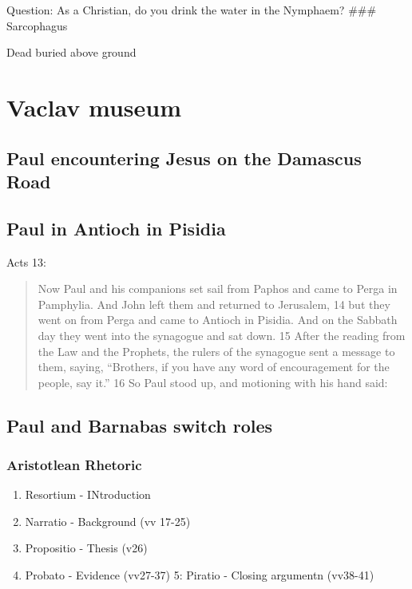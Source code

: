 \documentclass[
]{book}
\providecommand{\tightlist}{%
  \setlength{\itemsep}{0pt}\setlength{\parskip}{0pt}}
\begin{document}
Question: As a Christian, do you drink the water in the Nymphaem?
\#\#\# Sarcophagus

Dead buried above ground

\hypertarget{vaclav-museum}{%
\chapter{Vaclav museum}\label{vaclav-museum}}

\hypertarget{paul-encountering-jesus-on-the-damascus-road}{%
\section{Paul encountering Jesus on the Damascus Road}\label{paul-encountering-jesus-on-the-damascus-road}}

\hypertarget{paul-in-antioch-in-pisidia}{%
\section{Paul in Antioch in Pisidia}\label{paul-in-antioch-in-pisidia}}

Acts 13:

\begin{quote}
Now Paul and his companions set sail from Paphos and came to Perga in Pamphylia. And John left them and returned to Jerusalem, 14 but they went on from Perga and came to Antioch in Pisidia. And on the Sabbath day they went into the synagogue and sat down. 15 After the reading from the Law and the Prophets, the rulers of the synagogue sent a message to them, saying, ``Brothers, if you have any word of encouragement for the people, say it.'' 16 So Paul stood up, and motioning with his hand said:
\end{quote}

\hypertarget{paul-and-barnabas-switch-roles}{%
\section{Paul and Barnabas switch roles}\label{paul-and-barnabas-switch-roles}}

\hypertarget{aristotlean-rhetoric}{%
\subsection{Aristotlean Rhetoric}\label{aristotlean-rhetoric}}

\begin{enumerate}
\def\labelenumi{\arabic{enumi})}
\tightlist
\item
  Resortium - INtroduction
\item
  Narratio - Background (vv 17-25)
\item
  Propositio - Thesis (v26)
\item
  Probato - Evidence (vv27-37)
  5: Piratio - Closing argumentn (vv38-41)
\end{enumerate}
\end{document}
